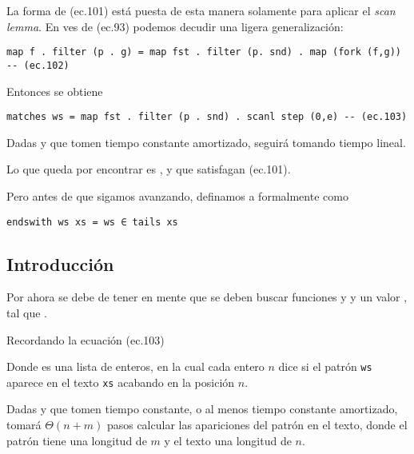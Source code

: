 La forma de (ec.101) está puesta de esta manera solamente para aplicar el \textit{scan lemma}. 
En ves de (ec.93) podemos decudir una ligera generalización:
\begin{verbatim}
map f . filter (p . g) = map fst . filter (p. snd) . map (fork (f,g))  -- (ec.102)
\end{verbatim}

Entonces se obtiene
\begin{verbatim}
matches ws = map fst . filter (p . snd) . scanl step (0,e) -- (ec.103)
\end{verbatim} 

Dadas  y  que tomen tiempo constante amortizado,  seguirá tomando tiempo lineal.

Lo que queda por encontrar es ,  y  que satisfagan (ec.101).

Pero antes de que sigamos avanzando, definamos a  formalmente como
\begin{verbatim}
endswith ws xs = ws ∈ tails xs
\end{verbatim}



\subsection{Introducción}

Por ahora se debe de tener en mente que se deben buscar funciones  y  y un
valor , tal que .

Recordando la ecuación (ec.103) %

Donde  es una lista de enteros, en la cual cada entero $n$ dice si el patrón
\texttt{ws} aparece en el texto \texttt{xs} acabando en la posición $n$.

Dadas  y  que tomen tiempo constante, o al menos tiempo constante amortizado,
 tomará $\Theta(n + m)$ pasos calcular las apariciones del patrón en el texto, donde
el patrón tiene una longitud de $m$ y el texto una longitud de $n$.

